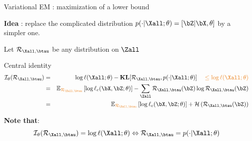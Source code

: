 \documentclass[compress,10pt]{beamer}
\begin{document}
 \begin{frame}{Variational EM  : maximization of a lower bound}

\textcolor{dgreen}{\textbf{Idea}} : replace the complicated distribution $p(\cdot | \Xall; \theta) = [\bZ | \bX, \theta]$ by a simpler one. 


Let $\mathcal{R}_{\Xall,\btau}$ be any distribution on   $\Zall$


\begin{block}{Central identity}
\begin{eqnarray*}
\mathcal{I}_{\theta}(\mathcal{R}_{\Xall,\btau}) &=& \log \ell(\Xall ; \theta) -   \mathbf{KL}[\mathcal{R}_{\Xall,\btau}, p(\cdot | \Xall; \theta)] \color{dgreen}\quad \leq   \log \ell(\Xall ; \theta)   \\
&=& \mathbb{E}_{\color{dgreen}\mathcal{R}_{\Xall,\btau}} \left[\log \ell_c(\bX,\bZ; \theta)   \right]  -   \sum_{\Zall} \mathcal{R}_{\Xall,\btau}(\bZ)  \log \mathcal{R}_{\Xall,\btau}({\bZ}) \\
&=& \mathbb{E}_{\color{dgreen}\mathcal{R}_{\Xall,\btau}} \left[\log \ell_c(\bX,\bZ; \theta)   \right]  +  \mathcal{H}\left(\mathcal{R}_{\Xall,\btau}(\bZ)\right) 
\end{eqnarray*}
\end{block} 

\textbf{Note that}:  
$$\mathcal{I}_{\theta}(\mathcal{R}_{\Xall,\btau})  = \log \ell(\Xall; \theta) \Leftrightarrow \mathcal{R}_{\Xall,\btau} = p(\cdot | \Xall; \theta)$$ 


\end{frame}
\end{document}
